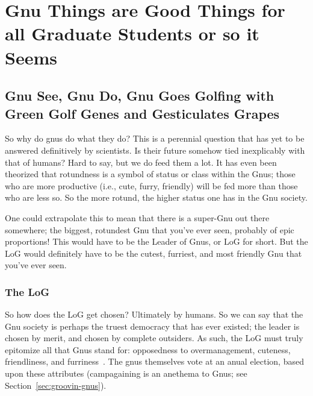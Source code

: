 %
%
%
%
%
%
%
%
%
%

%
%

\chapter{Gnu Things are Good Things for all Graduate Students or so it Seems}
\label{chap:golfing}

\section{Gnu See, Gnu Do, Gnu Goes Golfing with Green Golf Genes and
  Gesticulates Grapes}

So why do gnus do what they do?  This is a perennial question that has
yet to be answered definitively by scientists.  Is their future
somehow tied inexplicably with that of humans?  Hard to say, but we do
feed them a lot.  It has even been theorized that rotundness is a
symbol of status or class within the Gnus; those who are more
productive (i.e., cute, furry, friendly) will be fed more than those
who are less so.  So the more rotund, the higher status one has in the
Gnu society.

One could extrapolate this to mean that there is a super-Gnu out there
somewhere; the biggest, rotundest Gnu that you've ever seen, probably
of epic proportions!  This would have to be the Leader of Gnus, or LoG
for short.  But the LoG would definitely have to be the cutest,
furriest, and most friendly Gnu that you've ever seen.

\subsection{The LoG}

So how does the LoG get chosen?  Ultimately by humans.  So we can say
that the Gnu society is perhaps the truest democracy that has ever
existed; the leader is chosen by merit, and chosen by complete
outsiders.  As such, the LoG must truly epitomize all that Gnus stand
for: opposedness to overmanagement, cuteness, friendliness, and
furriness~\citep{gloonson98:_gnuly_discov_gnus}.  The gnus themselves
vote at an anual election, based upon these attributes (campagaining
is an anethema to Gnus; see Section~\ref{sec:groovin-gnus}).

